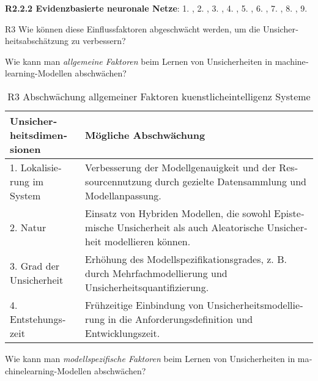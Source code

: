 \begin{otherlanguage}{ngerman}
{\begin{minipage}[t]{\textwidth}
\textbf{R2.2.2 Evidenzbasierte neuronale Netze}: 
1. \parencite{sensoy2018evidential},
2. \parencite[S.~2–3]{sensoy2018evidential},
3. \parencite[S.~4]{sensoy2018evidential},
4. \parencite[S.~5]{sensoy2018evidential},
5. \parencite[S.~6]{sensoy2018evidential},
6. \parencite[S.~6–7]{sensoy2018evidential},
7. \parencite{kendall2017uncertainties},
8. \parencite{kendall2017uncertainties},
9. \parencite[S.~6]{sensoy2018evidential}
\end{minipage}%
}


\newpage


R3 Wie können diese Einflussfaktoren abgeschwächt werden, um die Unsicherheitsabschätzung zu verbessern?

\newline
Wie kann man \textit{allgemeine Faktoren} beim Lernen von Unsicherheiten in \gls{machinelearning}-Modellen abschwächen?

\begin{table}[!htpb]
  \centering
  \footnotesize
  \begin{tabularx}{\textwidth}{|l|X|}
    \hline
    \textbf{Unsicherheitsdimensionen} & \textbf{Mögliche Abschwächung} \\
    \hline
    1. Lokalisierung im System & Verbesserung der Modellgenauigkeit und der Ressourcennutzung durch gezielte Datensammlung und Modellanpassung. \\
    \hline
    2. Natur & Einsatz von Hybriden Modellen, die sowohl \gls{Epistemische Unsicherheit} als auch \gls{Aleatorische Unsicherheit} modellieren können. \\
    \hline
    3. Grad der Unsicherheit & Erhöhung des Modellspezifikationsgrades, z. B. durch Mehrfachmodellierung und Unsicherheitsquantifizierung. \\
    \hline
    4. Entstehungszeit & Frühzeitige Einbindung von Unsicherheitsmodellierung in die Anforderungsdefinition und Entwicklungszeit. \\
    \hline
  \end{tabularx}
  \caption{R3 Abschwächung allgemeiner Faktoren \gls{kuenstlicheintelligenz} Systeme}\label{tab:chapter6r31}
\end{table}

\newline
Wie kann man \textit{modellspezifische Faktoren} beim Lernen von Unsicherheiten in \gls{machinelearning}-Modellen abschwächen?


\end{otherlanguage}
